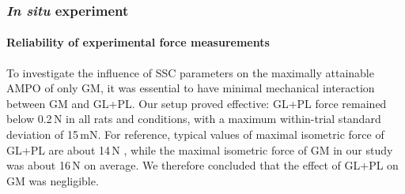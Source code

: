 \documentclass[
  10pt,
  letterpaper,
]{article}
\begin{document}
\subsubsection{\texorpdfstring{\emph{In situ}
experiment}{In situ experiment}}\label{in-situ-experiment-1}

\paragraph{Reliability of experimental force
measurements}\label{reliability-of-experimental-force-measurements}

To investigate the influence of SSC parameters on the maximally
attainable AMPO of only GM, it was essential to have minimal mechanical
interaction between GM and GL+PL. Our setup proved effective: GL+PL
force remained below 0.2\,N in all rats and conditions, with a maximum
within-trial standard deviation of 15\,mN. For reference, typical values
of maximal isometric force of GL+PL are about 14\,N
\citep{bernabei_significant_2015}, while the maximal isometric force of
GM in our study was about 16\,N on average. We therefore concluded that
the effect of GL+PL on GM was negligible.
\end{document}

